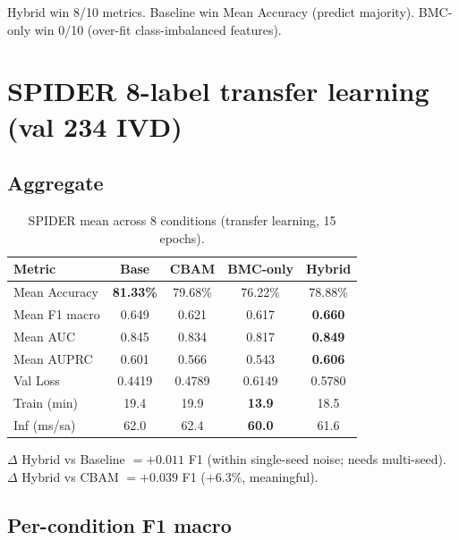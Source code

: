 \documentclass[11pt,a4paper]{article}
\newcommand{\best}[1]{\textbf{#1}}
\begin{document}
\noindent Hybrid win 8/10 metrics. Baseline win Mean Accuracy (predict
majority). BMC-only win 0/10 (over-fit class-imbalanced features).

\section{SPIDER 8-label transfer learning (val 234 IVD)}

\subsection*{Aggregate}

\begin{table}[h]
\centering
\caption{SPIDER mean across 8 conditions (transfer learning, 15 epochs).}
\begin{tabular}{@{}lcccc@{}}
\toprule
\rowcolor{tablehdr}
Metric & Base & CBAM & BMC-only & \best{Hybrid} \\
\midrule
Mean Accuracy & \best{81.33\%} & 79.68\% & 76.22\% & 78.88\% \\
Mean F1 macro & 0.649          & 0.621   & 0.617   & \best{0.660} \\
Mean AUC      & 0.845          & 0.834   & 0.817   & \best{0.849} \\
Mean AUPRC    & 0.601          & 0.566   & 0.543   & \best{0.606} \\
\midrule
Val Loss      & 0.4419         & 0.4789  & 0.6149  & 0.5780 \\
Train (min)   & 19.4           & 19.9    & \best{13.9} & 18.5 \\
Inf (ms/sa)   & 62.0           & 62.4    & \best{60.0} & 61.6 \\
\bottomrule
\end{tabular}
\end{table}

\noindent$\Delta$ Hybrid vs Baseline $= +0.011$ F1 (within
single-seed noise; needs multi-seed). $\Delta$ Hybrid vs CBAM $=
+0.039$ F1 ($+6.3\%$, meaningful).

\subsection*{Per-condition F1 macro}
\end{document}
